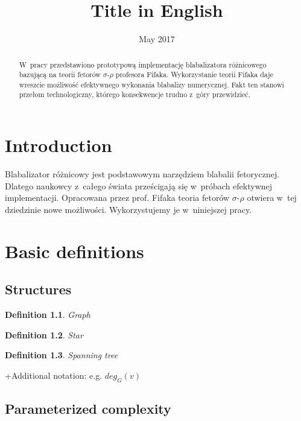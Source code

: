 \documentclass[en]{pracamgr}
\title{Title in English}
\date{May 2017}
\newtheorem{defi}{Definition}
\begin{document}
\maketitle

\begin{abstract}
  W~pracy przedstawiono prototypową implementację blabalizatora
  różnicowego bazującą na teorii fetorów $\sigma$-$\rho$ profesora
  Fifaka.  Wykorzystanie teorii Fifaka daje wreszcie możliwość
  efektywnego wykonania blabalizy numerycznej.  Fakt ten stanowi
  przełom technologiczny, którego konsekwencje trudno z~góry
  przewidzieć.
\end{abstract}

\tableofcontents

\chapter*{Introduction}

Blabalizator różnicowy jest podstawowym narzędziem blabalii
fetorycznej.  Dlatego naukowcy z~całego świata prześcigają się
w~próbach efektywnej implementacji.  Opracowana przez prof. Fifaka
teoria fetorów $\sigma$-$\rho$ otwiera w~tej dziedzinie nowe
możliwości.  Wykorzystujemy je w~niniejszej pracy.

\chapter{Basic definitions}\label{r:pojecia}

\section{Structures}

\begin{defi}\label{Graph}
 	Graph
\end{defi}


\begin{defi}\label{Star}
	Star
\end{defi}

\begin{defi}\label{Spaning tree}
	Spanning tree
\end{defi}
+Additional notation: e.g. $deg_G(v)$


\section{Parameterized complexity}
\end{document}
